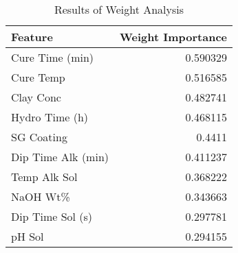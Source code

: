 
    \begin{table*}[h]
        \centering
        \begin{tabular}{lr}
\hline
 Feature            &   Weight Importance \\
\hline
 Cure Time (min)    &            0.590329 \\
 Cure Temp          &            0.516585 \\
 Clay Conc          &            0.482741 \\
 Hydro Time (h)     &            0.468115 \\
 SG Coating         &            0.4411   \\
 Dip Time Alk (min) &            0.411237 \\
 Temp Alk Sol       &            0.368222 \\
 NaOH Wt\%          &            0.343663 \\
 Dip Time Sol (s)   &            0.297781 \\
 pH Sol             &            0.294155 \\
\hline
\end{tabular}
        \caption{Results of Weight Analysis}
        \label{weight_analysis}
    \end{table*}
    
